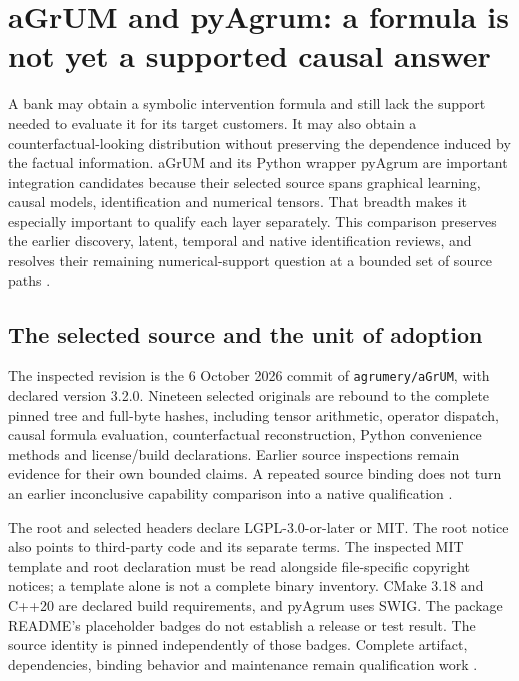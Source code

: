 \section{aGrUM and pyAgrum: a formula is not yet a supported causal answer}
\label{sec:exec24-agrum-reuse}

A bank may obtain a symbolic intervention formula and still lack the support
needed to evaluate it for its target customers. It may also obtain a
counterfactual-looking distribution without preserving the dependence induced
by the factual information. aGrUM and its Python wrapper pyAgrum are important
integration candidates because their selected source spans graphical
learning, causal models, identification and numerical tensors. That breadth
makes it especially important to qualify each layer separately. This
comparison preserves the earlier discovery, latent, temporal and native
identification reviews, and resolves their remaining numerical-support
question at a bounded set of source paths
\citep{exec13_cxx_agrum,exec14_native_agrum,exec16_ct_agrum,
exec19_cxx_identification_source,exec24_agrum_source}.

\subsection{The selected source and the unit of adoption}
The inspected revision is the 6 October 2026 commit of
\texttt{agrumery/aGrUM}, with declared version 3.2.0. Nineteen selected
originals are rebound to the complete pinned tree and full-byte hashes,
including tensor arithmetic, operator dispatch, causal formula evaluation,
counterfactual reconstruction, Python convenience methods and license/build
declarations. Earlier source inspections remain evidence for their own
bounded claims. A repeated source binding does not turn an earlier
inconclusive capability comparison into a native qualification
\citep{exec24_agrum_source,exec24_agrum_choice}.

The root and selected headers declare LGPL-3.0-or-later or MIT. The root
notice also points to third-party code and its separate terms. The inspected
MIT template and root declaration must be read alongside file-specific
copyright notices; a template alone is not a complete binary inventory.
CMake 3.18 and C++20 are declared build requirements, and pyAgrum uses SWIG.
The package README's placeholder badges do not establish a release or test
result. The source identity is pinned independently of those badges.
Complete artifact, dependencies, binding behavior and maintenance remain
qualification work \citep{exec24_agrum_source}.

